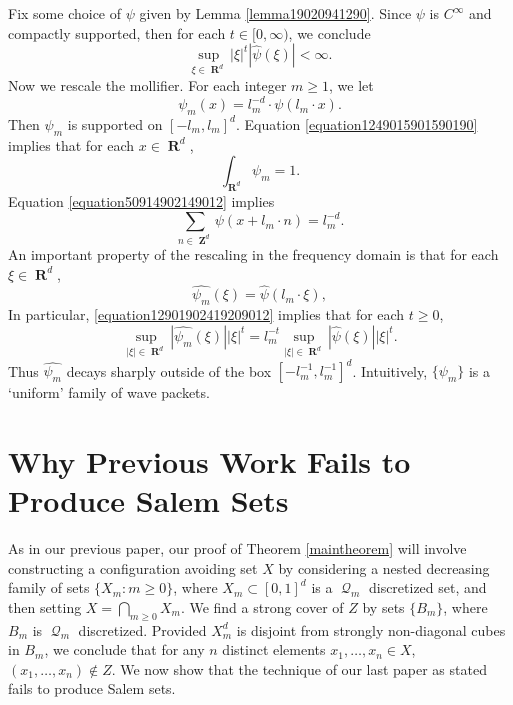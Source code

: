 \documentclass[12pt,reqno]{article}
\numberwithin{equation}{section}
\DeclareMathOperator{\RR}{\mathbf{R}}
\DeclareMathOperator{\ZZ}{\mathbf{Z}}
\DeclareMathOperator{\DQ}{\mathcal{Q}}
\begin{document}
Fix some choice of $\psi$ given by Lemma \ref{lemma19020941290}. Since $\psi$ is $C^\infty$ and compactly supported, then for each $t \in [0,\infty)$, we conclude
%
\begin{equation} \label{equation682928418931289}
	\sup_{\xi \in \RR^d} |\xi|^t |\widehat{\psi}(\xi)| < \infty.
\end{equation}
%
Now we rescale the mollifier. For each integer $m \geq 1$, we let
%
\[ \psi_m(x) = l_m^{-d} \cdot \psi(l_m \cdot x). \]
%
Then $\psi_m$ is supported on $[-l_m,l_m]^d$. Equation \eqref{equation1249015901590190} implies that for each $x \in \RR^d$,
%
\begin{equation} \label{equation19204910490190190}
	\int_{\RR^d} \psi_m = 1.
\end{equation}
%
Equation \eqref{equation50914902149012} implies
%
\begin{equation} \label{equation990249012409129041290} \sum_{n \in \ZZ^d} \psi(x + l_m \cdot n) = l_m^{-d}. \end{equation}
%
An important property of the rescaling in the frequency domain is that for each $\xi \in \RR^d$,
%
\begin{equation} \label{equation12901902419209012}
    \widehat{\psi_m}(\xi) = \widehat{\psi}(l_m \cdot \xi),
\end{equation}
%
In particular, \eqref{equation12901902419209012} implies that for each $t \geq 0$,
%
\begin{equation}
    \sup_{|\xi| \in \RR^d} |\widehat{\psi_m}(\xi)| |\xi|^t = l_m^{-t} \sup_{|\xi| \in \RR^d} |\widehat{\psi}(\xi)| |\xi|^t.
\end{equation}
%
Thus $\widehat{\psi_m}$ decays sharply outside of the box $[-l_m^{-1}, l_m^{-1}]^d$. Intuitively, $\{ \psi_m \}$ is a `uniform' family of wave packets.

\section{Why Previous Work Fails to Produce Salem Sets}

As in our previous paper, our proof of Theorem \ref{maintheorem} will involve constructing a configuration avoiding set $X$ by considering a nested decreasing family of sets $\{ X_m : m \geq 0 \}$, where $X_m \subset [0,1]^d$ is a $\DQ_m$ discretized set, and then setting $X = \bigcap_{m \geq 0} X_m$. We find a strong cover of $Z$ by sets $\{ B_m \}$, where $B_m$ is $\DQ_m$ discretized. Provided $X_m^d$ is disjoint from strongly non-diagonal cubes in $B_m$, we conclude that for any $n$ distinct elements $x_1, \dots, x_n \in X$, $(x_1,\dots,x_n) \not \in Z$. We now show that the technique of our last paper as stated fails to produce Salem sets.
\end{document}
